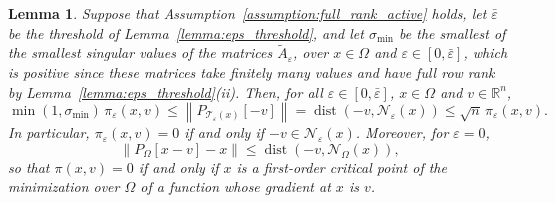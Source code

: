 \documentclass[pdflatex,sn-mathphys-num]{sn-jnl}%
\theoremstyle{thmstyleone}%
\newtheorem{lemma}[theorem]{Lemma}
\newcommand{\RR}{{\mathbb{R}}} %
\newcommand{\calN}{{\mathcal{N}}}
\newcommand{\calT}{{\mathcal{T}}}
\newcommand{\proj}[2]{P_{#1} \left[ {#2} \right]} %
\begin{document}
\begin{lemma}\label{lemma:certification}
	Suppose that Assumption~\ref{assumption:full_rank_active} holds, let $\bar\varepsilon$ be the threshold of Lemma~\ref{lemma:eps_threshold}, and let $\sigma_{\min}$ be the smallest of the smallest singular values of the matrices $\tilde{A}_\varepsilon$, over $x \in \Omega$ and $\varepsilon \in [0,\bar\varepsilon]$, which is positive since these matrices take finitely many values and have full row rank by Lemma~\ref{lemma:eps_threshold}(ii). Then, for all $\varepsilon \in [0,\bar\varepsilon]$, $x \in \Omega$ and $v \in \RR^n$,
	\begin{equation}\label{eq:certification}
		\min(1,\sigma_{\min})\,\pi_\varepsilon(x,v) \le \left\|\proj{\calT_\varepsilon(x)}{-v}\right\| = \operatorname{dist}\left(-v,\calN_\varepsilon(x)\right) \le \sqrt{n}\,\pi_\varepsilon(x,v).
	\end{equation}
	In particular, $\pi_\varepsilon(x,v) = 0$ if and only if $-v \in \calN_\varepsilon(x)$. Moreover, for $\varepsilon = 0$,
	\begin{equation}\label{eq:proj_grad_le_dist}
		\|\proj{\Omega}{x-v}-x\| \le \operatorname{dist}\left(-v,\calN_\Omega(x)\right),
	\end{equation}
	so that $\pi(x,v) = 0$ if and only if $x$ is a first-order critical point of the minimization over $\Omega$ of a function whose gradient at $x$ is $v$.
\end{lemma}
\end{document}

